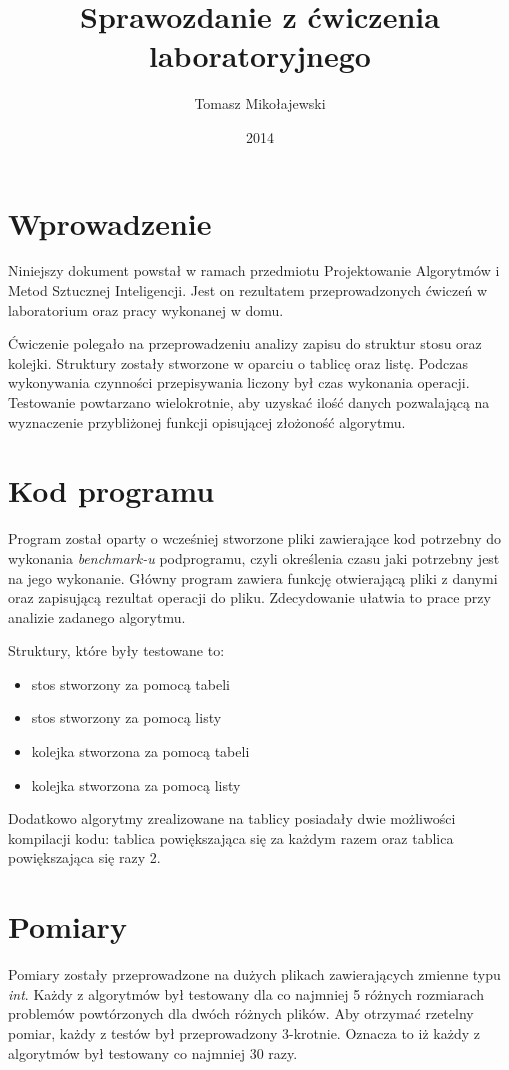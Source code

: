 \documentclass[12pt,a4paper,titlepage]{article}
\title{Sprawozdanie z ćwiczenia laboratoryjnego}
\date{2014}
\author{Tomasz Mikołajewski }
\begin{document}
\maketitle
\pagestyle{empty}
\tableofcontents

\section{Wprowadzenie}
Niniejszy dokument powstał w ramach przedmiotu Projektowanie Algorytmów i Metod Sztucznej Inteligencji. Jest on rezultatem przeprowadzonych ćwiczeń w laboratorium oraz pracy wykonanej w domu.


Ćwiczenie polegało na przeprowadzeniu analizy zapisu do struktur stosu oraz kolejki. Struktury zostały stworzone w oparciu o tablicę oraz listę. Podczas wykonywania czynności przepisywania liczony był czas wykonania operacji. Testowanie powtarzano wielokrotnie, aby uzyskać ilość danych pozwalającą na wyznaczenie przybliżonej funkcji opisującej złożoność algorytmu. 

\section{Kod programu}
Program został oparty o wcześniej stworzone pliki zawierające kod potrzebny do wykonania \textit {benchmark-u} podprogramu, czyli określenia czasu jaki potrzebny jest na jego wykonanie. Główny program zawiera funkcję otwierającą pliki z danymi oraz zapisującą rezultat operacji do pliku. Zdecydowanie ułatwia to prace przy analizie zadanego algorytmu.

Struktury, które były testowane to:
\begin{itemize}
\item stos stworzony za pomocą tabeli
\item stos stworzony za pomocą listy
\item kolejka stworzona za pomocą tabeli
\item kolejka stworzona za pomocą listy
\end{itemize}


Dodatkowo algorytmy zrealizowane na tablicy posiadały dwie możliwości kompilacji kodu: tablica powiększająca się za każdym razem oraz tablica powiększająca się razy 2.

\section{Pomiary}
Pomiary zostały przeprowadzone na dużych plikach zawierających zmienne typu \textit {int}. Każdy z algorytmów był testowany dla co najmniej 5 różnych rozmiarach problemów powtórzonych dla dwóch różnych plików. Aby otrzymać rzetelny pomiar, każdy z testów był przeprowadzony 3-krotnie. Oznacza to iż każdy z algorytmów był testowany co najmniej 30 razy. 
\end{document}
